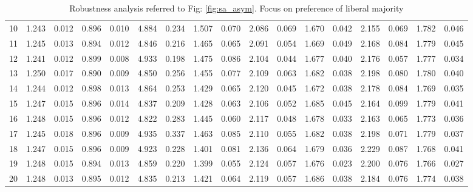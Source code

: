 \documentclass{article}
\begin{document}
\begin{table}[H]
{\begin{tabular}{|c|c|c|c|c|c|c|c|c|c|c|c|c|c|c|c|c|}
    10 & 1.243 & 0.012 & 0.896 & 0.010 & 4.884 & 0.234 & 1.507 & 0.070 & 2.086 & 0.069 & 1.670 & 0.042 & 2.155 & 0.069 & 1.782 & 0.046 \\ 
    11 & 1.245 & 0.013 & 0.894 & 0.012 & 4.846 & 0.216 & 1.465 & 0.065 & 2.091 & 0.054 & 1.669 & 0.049 & 2.168 & 0.084 & 1.779 & 0.045 \\ 
    12 & 1.241 & 0.012 & 0.899 & 0.008 & 4.933 & 0.198 & 1.475 & 0.086 & 2.104 & 0.044 & 1.677 & 0.040 & 2.176 & 0.057 & 1.777 & 0.034 \\ 
    13 & 1.250 & 0.017 & 0.890 & 0.009 & 4.850 & 0.256 & 1.455 & 0.077 & 2.109 & 0.063 & 1.682 & 0.038 & 2.198 & 0.080 & 1.780 & 0.040 \\ 
    14 & 1.244 & 0.012 & 0.898 & 0.013 & 4.864 & 0.253 & 1.429 & 0.065 & 2.120 & 0.045 & 1.672 & 0.038 & 2.178 & 0.084 & 1.769 & 0.035 \\ 
    15 & 1.247 & 0.015 & 0.896 & 0.014 & 4.837 & 0.209 & 1.428 & 0.063 & 2.106 & 0.052 & 1.685 & 0.045 & 2.164 & 0.099 & 1.779 & 0.041 \\ 
    16 & 1.248 & 0.015 & 0.896 & 0.012 & 4.822 & 0.283 & 1.445 & 0.060 & 2.117 & 0.048 & 1.678 & 0.033 & 2.163 & 0.065 & 1.773 & 0.036 \\ 
    17 & 1.245 & 0.018 & 0.896 & 0.009 & 4.935 & 0.337 & 1.463 & 0.085 & 2.110 & 0.055 & 1.682 & 0.038 & 2.198 & 0.071 & 1.779 & 0.037 \\ 
    18 & 1.247 & 0.015 & 0.896 & 0.009 & 4.923 & 0.228 & 1.401 & 0.081 & 2.136 & 0.064 & 1.679 & 0.036 & 2.229 & 0.087 & 1.768 & 0.041 \\ 
    19 & 1.248 & 0.015 & 0.894 & 0.013 & 4.859 & 0.220 & 1.399 & 0.055 & 2.124 & 0.057 & 1.676 & 0.023 & 2.200 & 0.076 & 1.766 & 0.027 \\ 
    20 & 1.248 & 0.013 & 0.895 & 0.012 & 4.835 & 0.213 & 1.421 & 0.064 & 2.119 & 0.057 & 1.686 & 0.038 & 2.184 & 0.076 & 1.774 & 0.038 \\ 
   \hline
\end{tabular}
}

\caption{Robustness analysis referred to Fig: \ref{fig:sa_asym}. Focus on preference of liberal majority}
\label{tab:sa_asym_vllblc}
\end{table}
\end{document}

